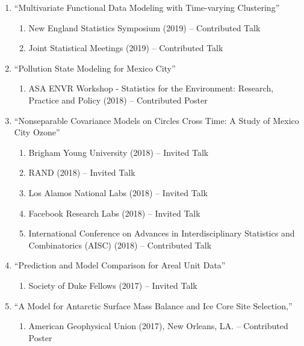 \documentclass[12pt]{article}
\begin{document}
\begin{enumerate}[label=$\bullet$]
\item ``Multivariate Functional Data Modeling with Time-varying Clustering''
\begin{enumerate}[label=$\cdot$]
\item New England Statistics Symposium (2019) -- Contributed Talk
\item Joint Statistical Meetings (2019) -- Contributed Talk
\end{enumerate}
\item ``Pollution State Modeling for Mexico City''
\begin{enumerate}[label=$\cdot$]
\item ASA ENVR Workshop - Statistics for the Environment: Research, Practice and Policy (2018) -- Contributed Poster
\end{enumerate}
\item ``Nonseparable Covariance Models on Circles Cross Time: A Study of Mexico City Ozone''
\begin{enumerate}[label=$\cdot$]
\item Brigham Young University (2018) -- Invited Talk
\item RAND (2018) -- Invited Talk
\item Los Alamos National Labs (2018) -- Invited Talk
\item Facebook Research Labs (2018) -- Invited Talk
\item International Conference on Advances in Interdisciplinary Statistics and Combinatorics (AISC) (2018) -- Contributed Talk
\end{enumerate}
\item ``Prediction and Model Comparison for Areal Unit Data''
\begin{enumerate}[label=$\cdot$]
\item Society of Duke Fellows (2017) -- Invited Talk
\end{enumerate}
\item  ``A Model for Antarctic Surface Mass Balance and Ice Core Site Selection,'' 
\begin{enumerate}[label=$\cdot$]
\item American Geophysical Union (2017), New Orleans, LA. -- Contributed Poster

\end{enumerate}
\end{enumerate}
\end{document}
